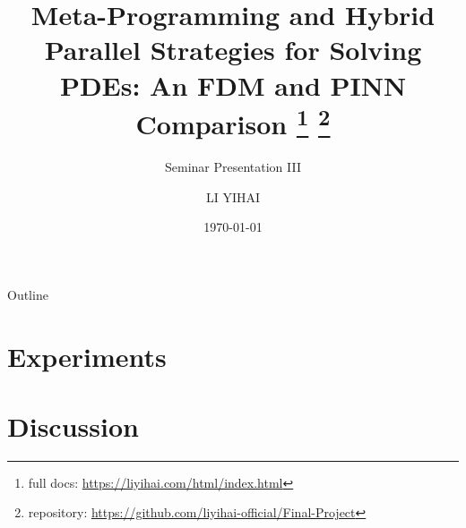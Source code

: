 \documentclass{my-Presentation}
\title[An FDM and PINN Comparison]{
  Meta-Programming and Hybrid Parallel Strategies for Solving PDEs: An FDM and PINN Comparison
  \footnote{full docs: \url{https://liyihai.com/html/index.html}}
  \footnote{repository: \url{https://github.com/liyihai-official/Final-Project}}
}
\subtitle{Seminar Presentation III}
\author[LI Yihai]{
  \normalsize
  LI YIHAI \\[1ex]
  \vspace*{-.5em}
}
\institute[Mathematics Institute]{
  Student ID: 23345919 \\[1ex]
  Supervision: Michael Peardon
}
\date{\today \vspace*{-1em}}
\begin{document}
\begin{frame}
  \titlepage
\end{frame}

\begin{frame}{Outline}
  \begin{multicols}{2}
    \tableofcontents
  \end{multicols}
\end{frame}








\section{Experiments}


\section{Discussion}
\end{document}
